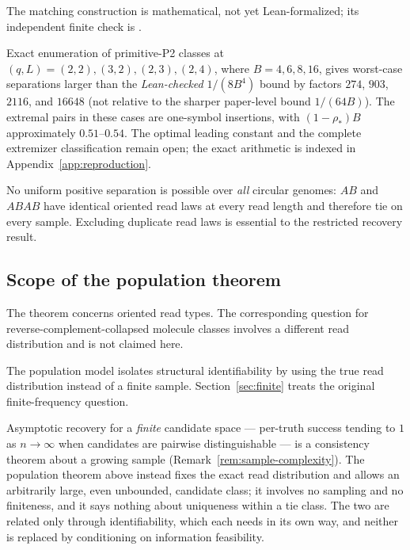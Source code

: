 The matching construction is mathematical, not yet
Lean-formalized; its independent finite check is
.

\begin{remark}
\label{rem:rate-sharpness}
Exact enumeration of primitive-P2 classes at
$(q,L)=(2,2),(3,2),(2,3),(2,4)$, where $B=4,6,8,16$,
gives worst-case separations larger than the
\emph{Lean-checked} $1/(8B^4)$ bound by factors
$274$, $903$, $2116$, and $16648$ (not relative to the
sharper paper-level bound $1/(64B)$).
The extremal pairs in these cases are one-symbol insertions,
with $(1-\rho_*)B$ approximately $0.51$--$0.54$.
The optimal leading constant and the complete extremizer
classification remain open; the exact arithmetic is indexed in
Appendix~\ref{app:reproduction}.

No uniform positive separation is possible over \emph{all}
circular genomes: $AB$ and $ABAB$ have identical oriented read
laws at every read length and therefore tie on every sample.
Excluding duplicate read laws is essential to the restricted
recovery result.
\end{remark}




\subsection{Scope of the population theorem}

The theorem concerns oriented read types. The corresponding question for
reverse-complement-collapsed molecule classes involves a different read
distribution and is not claimed here.

The population model isolates structural identifiability by using the true
read distribution instead of a finite sample. Section~\ref{sec:finite}
treats the original finite-frequency question.

\begin{remark}
\label{rem:consistency-distinction}
Asymptotic recovery for a \emph{finite} candidate space --- per-truth success
tending to $1$ as $n\to\infty$ when candidates are pairwise distinguishable ---
is a consistency theorem about a growing sample
(Remark~\ref{rem:sample-complexity}). The population theorem above instead
fixes the exact read distribution and allows an arbitrarily large, even
unbounded, candidate class; it involves no sampling and no finiteness, and it
says nothing about uniqueness within a tie class. The two are related only
through identifiability, which each needs in its own way, and neither is
replaced by conditioning on information feasibility.
\end{remark}

